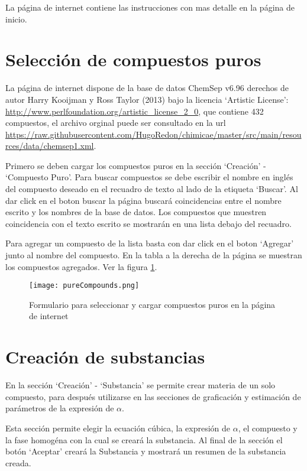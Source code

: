 	La página de internet contiene las instrucciones con mas detalle en la página de inicio.

\section{Selección de compuestos puros}\label{sec:webCompounds}

	La página de internet dispone de la base de datos ChemSep v6.96 derechos de autor  Harry Kooijman y Ross Taylor (2013) bajo la licencia `Artistic License': \url{ http://www.perlfoundation.org/artistic_license_2_0}, que contiene 432 compuestos, el archivo orginal puede ser consultado en la url \url{https://raw.githubusercontent.com/HugoRedon/chimicae/master/src/main/resources/data/chemsep1.xml}.

	Primero se deben cargar los compuestos puros en la sección `Creación' - `Compuesto Puro'. Para buscar compuestos se debe escribir el nombre en inglés del compuesto deseado en el recuadro de texto al lado de la etiqueta `Buscar'. Al dar click en el boton buscar la página buscará coincidencias entre el nombre escrito y los nombres de la base de datos. Los compuestos que muestren coincidencia con el texto escrito se mostrarán en una lista debajo del recuadro.

	Para agregar un compuesto de la lista basta con dar click en el boton `Agregar' junto al nombre del compuesto. En la tabla a la derecha de la página se muestran los compuestos agregados. Ver la figura \ref{fig:pureCompounds}.

	\begin{figure}[H]
		\centering
		\texttt{[image: pureCompounds.png]}
		\caption{Formulario para seleccionar y cargar compuestos puros en la página de internet}
		\label{fig:pureCompounds}
	\end{figure}

\section{Creación de substancias}\label{sec:webSubstanceCreator}
	
	En la sección `Creación' - `Substancia' se permite crear materia de un solo compuesto, para después utilizarse en las secciones de graficación y estimación de parámetros de la expresión de $\alpha$.

	Esta sección permite elegir la ecuación cúbica, la expresión de $\alpha$, el compuesto y la fase homogéna con la cual se creará la substancia. Al final de la sección el botón `Aceptar' creará la Substancia y mostrará un resumen de la substancia creada.

